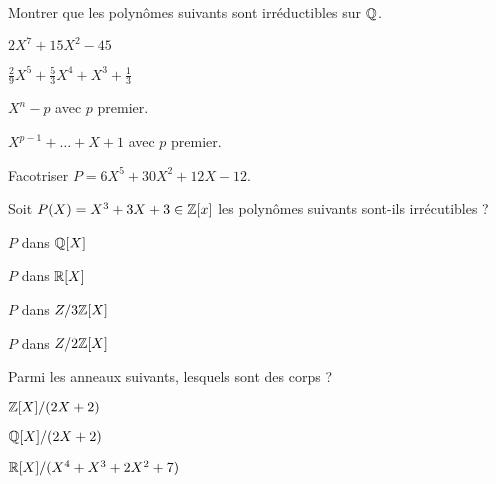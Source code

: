 \documentclass[french]{report}
\begin{document}
\begin{exo}
    Montrer que les polynômes suivants sont irréductibles sur \(\mathbb{Q}\).
    \begin{q}{1}
        \(2X^7+15X^2-45\)
    \end{q}
    \begin{q}{2}
        \(\frac29X^5+\frac53X^4+X^3+\frac13\)
    \end{q}
    \begin{q}{3}
        \(X^n-p\) avec \(p\) premier.
    \end{q}
    \begin{q}{4}
        \(X^{p-1}+\dots+X+1\) avec \(p\) premier.
    \end{q}
    \begin{q}{5}
        Facotriser \(P=6X^5+30X^2+12X-12\).
    \end{q}
\end{exo}

\begin{exo}
    Soit \(P(X)=X^3+3X+3\in\mathbb{Z}[x]\) les polynômes suivants sont-ils irrécutibles ?
    \begin{q}{1}
        \(P\) dans \(\mathbb{Q}[X]\)
    \end{q}
    \begin{q}{2}
        \(P\) dans \(\mathbb{R}[X]\)
    \end{q}
    \begin{q}{3}
        \(P\) dans \(Z/3\mathbb{Z}[X]\)
    \end{q}
    \begin{q}{4}
        \(P\) dans \(Z/2\mathbb{Z}[X]\)
    \end{q}
\end{exo}

\begin{exo}
    Parmi les anneaux suivants, lesquels sont des corps ?
    \begin{q}{1}
        \(\mathbb{Z}[X]/(2X+2)\)
    \end{q}
    \begin{q}{2}
        \(\mathbb{Q}[X]/(2X+2)\)
    \end{q}
    \begin{q}{3}
        \(\mathbb{R}[X]/(X^4+X^3+2X^2+7)\)
    \end{q}
\end{exo}
\end{document}
